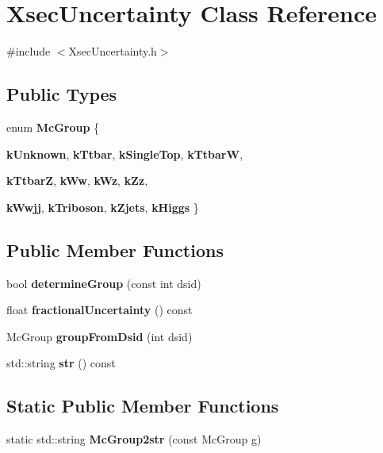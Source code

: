 \hypertarget{classXsecUncertainty}{
\section{XsecUncertainty Class Reference}
\label{classXsecUncertainty}
}


{\ttfamily \#include $<$XsecUncertainty.h$>$}\subsection*{Public Types}
\begin{DoxyCompactItemize}
\item 
enum {\bfseries McGroup} \{ \par
{\bfseries kUnknown}, 
{\bfseries kTtbar}, 
{\bfseries kSingleTop}, 
{\bfseries kTtbarW}, 
\par
{\bfseries kTtbarZ}, 
{\bfseries kWw}, 
{\bfseries kWz}, 
{\bfseries kZz}, 
\par
{\bfseries kWwjj}, 
{\bfseries kTriboson}, 
{\bfseries kZjets}, 
{\bfseries kHiggs}
 \}
\end{DoxyCompactItemize}
\subsection*{Public Member Functions}
\begin{DoxyCompactItemize}
\item 
\hypertarget{classXsecUncertainty_a0e28975a75c446f7b4c955f8aa902e0a}{
bool {\bfseries determineGroup} (const int dsid)}
\label{classXsecUncertainty_a0e28975a75c446f7b4c955f8aa902e0a}

\item 
\hypertarget{classXsecUncertainty_af521cd8cfe7bd65112460d064c9259c7}{
float {\bfseries fractionalUncertainty} () const }
\label{classXsecUncertainty_af521cd8cfe7bd65112460d064c9259c7}

\item 
\hypertarget{classXsecUncertainty_a6949891c43b8e4c854e58907a889c90d}{
McGroup {\bfseries groupFromDsid} (int dsid)}
\label{classXsecUncertainty_a6949891c43b8e4c854e58907a889c90d}

\item 
\hypertarget{classXsecUncertainty_a29d96d66897cc57bd0ae79afdc8e692a}{
std::string {\bfseries str} () const }
\label{classXsecUncertainty_a29d96d66897cc57bd0ae79afdc8e692a}

\end{DoxyCompactItemize}
\subsection*{Static Public Member Functions}
\begin{DoxyCompactItemize}
\item 
\hypertarget{classXsecUncertainty_aeb740b59fb80a84961cfdaf6774eb023}{
static std::string {\bfseries McGroup2str} (const McGroup g)}
\label{classXsecUncertainty_aeb740b59fb80a84961cfdaf6774eb023}

\end{DoxyCompactItemize}
